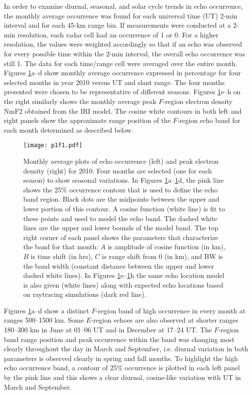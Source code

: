 In order to examine diurnal, seasonal, and solar cycle trends in echo occurrence, the monthly average occurrence was found for each universal time (UT) 2-min interval and for each 45-km range bin. If measurements were conducted at a 2-min resolution, each radar cell had an occurrence of 1 or 0. For a higher resolution, the values were weighted accordingly so that if an echo was observed for every possible time within the 2-min interval, the overall echo occurrence was still 1. The data for each time/range cell were averaged over the entire month. Figures \ref{fig:month_avg_occ}a--d show monthly average occurrence expressed in percentage for four selected months in year 2010 versus UT and slant range. The four months presented were chosen to be representative of different seasons. Figures \ref{fig:month_avg_occ}e--h on the right similarly shows the monthly average peak \(F\)-region electron density NmF2 obtained from the IRI model. The cosine white contours in both left and right panels show the approximate range position of the \(F\)-region echo band for each month determined as described below.
	
\begin{figure}
\texttt{[image: p1f1.pdf]}
\caption{Monthly average plots of echo occurrence (left) and peak electron density (right) for 2010.  Four months are selected (one for each season) to show seasonal variations. In Figures \ref{fig:month_avg_occ}a--\ref{fig:month_avg_occ}d,  the pink line shows the 25\% occurrence contour that is used to define the echo band region. Black dots are the midpoints between the upper and lower portion of this contour.  A cosine function (white line) is fit to these points and used to model the echo band. The dashed white lines are the upper and lower bounds of the model band. The top right corner of each panel shows the parameters that characterize the band for that month: \(A\) is amplitude of cosine function (in km), \(B\) is time shift (in hrs), \(C\) is range shift from 0 (in km), and BW is the band width (constant distance between the upper and lower dashed white lines).  In Figures \ref{fig:month_avg_occ}e--\ref{fig:month_avg_occ}h the same echo location model is also given (white lines) along with expected echo locations based on raytracing simulations (dark red line).}
\label{fig:month_avg_occ}
\end{figure}

Figures \ref{fig:month_avg_occ}a--d show a distinct \(F\)-region band of high occurrence in every month at ranges 500--1500 km. Some \(E\)-region echoes are also observed at shorter ranges 180--300 km in June at 01--06 UT and in December at 17--24 UT. The \(F\)-region band range position and peak occurrence within the band was changing most clearly throughout the day in March and September, i.e. diurnal variation in both parameters is observed clearly in spring and fall months. To highlight the high echo occurrence band, a contour of 25\% occurrence is plotted in each left panel by the pink line and this shows a clear diurnal, cosine-like variation with UT in March and September.

